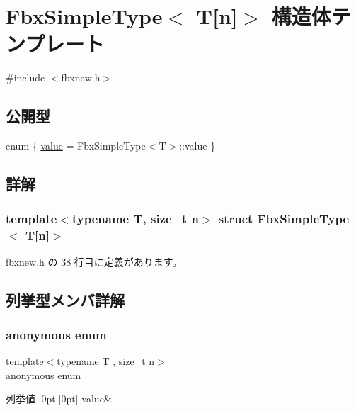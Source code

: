 \hypertarget{struct_fbx_simple_type_3_01_t[n]_4}{}\section{Fbx\+Simple\+Type$<$ T\mbox{[}n\mbox{]}$>$ 構造体テンプレート}
\label{struct_fbx_simple_type_3_01_t[n]_4}


{\ttfamily \#include $<$fbxnew.\+h$>$}

\subsection*{公開型}
\begin{DoxyCompactItemize}
\item 
enum \{ \hyperlink{struct_fbx_simple_type_3_01_t[n]_4_a57a3418a309c16047895533b4c30bf13ae090ea116d72509fb797fa0bdb5f3edb}{value} = Fbx\+Simple\+Type$<$T$>$\+:\+:value
 \}
\end{DoxyCompactItemize}


\subsection{詳解}
\subsubsection*{template$<$typename T, size\+\_\+t n$>$\newline
struct Fbx\+Simple\+Type$<$ T\mbox{[}n\mbox{]}$>$}



 fbxnew.\+h の 38 行目に定義があります。



\subsection{列挙型メンバ詳解}
\mbox{\label{struct_fbx_simple_type_3_01_t[n]_4_a57a3418a309c16047895533b4c30bf13}} 
\subsubsection{\texorpdfstring{anonymous enum}{anonymous enum}}
{\footnotesize\ttfamily template$<$typename T , size\+\_\+t n$>$ \\
anonymous enum}

\begin{DoxyEnumFields}{列挙値}
[0pt][0pt]{}\mbox{\label{struct_fbx_simple_type_3_01_t[n]_4_a57a3418a309c16047895533b4c30bf13ae090ea116d72509fb797fa0bdb5f3edb}} 
value&\\
\hline

\end{DoxyEnumFields}


